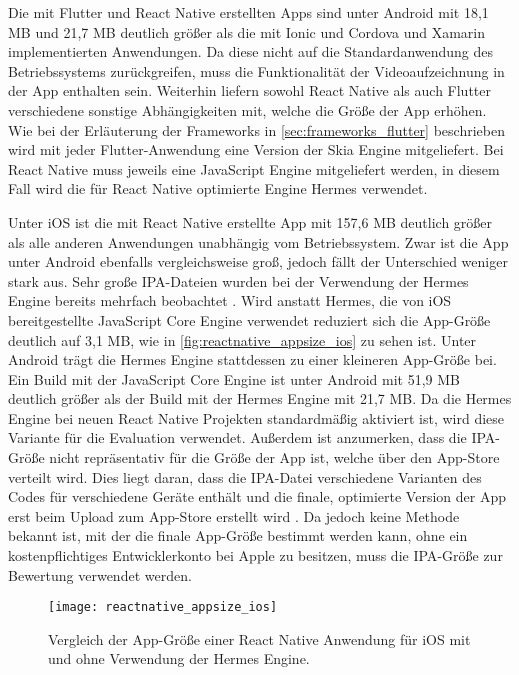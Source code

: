 Die mit Flutter und React Native erstellten Apps sind unter Android mit 18,1 MB und 21,7 MB deutlich größer als die mit Ionic und Cordova und Xamarin implementierten Anwendungen.
Da diese nicht auf die Standardanwendung des Betriebssystems zurückgreifen, muss die Funktionalität der Videoaufzeichnung in der App enthalten sein.
Weiterhin liefern sowohl React Native als auch Flutter verschiedene sonstige Abhängigkeiten mit, welche die Größe der App erhöhen.
Wie bei der Erläuterung der Frameworks in \autoref{sec:frameworks_flutter} beschrieben wird mit jeder Flutter-Anwendung eine Version der Skia Engine mitgeliefert.
Bei React Native muss jeweils eine JavaScript Engine mitgeliefert werden, in diesem Fall wird die für React Native optimierte Engine Hermes verwendet.

Unter iOS ist die mit React Native erstellte App mit 157,6 MB deutlich größer als alle anderen Anwendungen unabhängig vom Betriebssystem.
Zwar ist die App unter Android ebenfalls vergleichsweise groß, jedoch fällt der Unterschied weniger stark aus.
Sehr große \ac{IPA}-Dateien wurden bei der Verwendung der Hermes Engine bereits mehrfach beobachtet \cite{Hermes_appsize,Hermes_appsize_2}.
Wird anstatt Hermes, die von iOS bereitgestellte JavaScript Core Engine verwendet reduziert sich die App-Größe deutlich auf 3,1 MB, wie in \autoref{fig:reactnative_appsize_ios} zu sehen ist.
Unter Android trägt die Hermes Engine stattdessen zu einer kleineren App-Größe bei.
Ein Build mit der JavaScript Core Engine ist unter Android mit 51,9 MB deutlich größer als der Build mit der Hermes Engine mit 21,7 MB.
Da die Hermes Engine bei neuen React Native Projekten standardmäßig aktiviert ist, wird diese Variante für die Evaluation verwendet.
Außerdem ist anzumerken, dass die \ac{IPA}-Größe nicht repräsentativ für die Größe der App ist, welche über den App-Store verteilt wird.
Dies liegt daran, dass die \ac{IPA}-Datei verschiedene Varianten des Codes für verschiedene Geräte enthält und die finale, optimierte Version der App erst beim Upload zum App-Store erstellt wird \cite{IPA_Size}.
Da jedoch keine Methode bekannt ist, mit der die finale App-Größe bestimmt werden kann, ohne ein kostenpflichtiges Entwicklerkonto bei Apple zu besitzen, muss die \ac{IPA}-Größe zur Bewertung verwendet werden.

\begin{figure}[ht]
  \centering 
  \texttt{[image: reactnative\_appsize\_ios]}
   \caption{Vergleich der App-Größe einer React Native Anwendung für iOS mit und ohne Verwendung der Hermes Engine.}
  \label{fig:reactnative_appsize_ios}
\end{figure}


